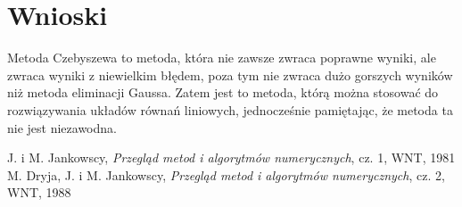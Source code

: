 \documentclass[a4paper]{article}
\begin{document}
\section{Wnioski}
Metoda Czebyszewa to metoda, która nie zawsze zwraca poprawne wyniki, ale zwraca wyniki z niewielkim błędem, poza tym nie zwraca dużo gorszych wyników niż metoda eliminacji Gaussa. Zatem jest to metoda, którą można stosować do rozwiązywania układów równań liniowych, jednocześnie pamiętając, że metoda ta nie jest niezawodna.
\begin{thebibliography}{9}
 J. i M. Jankowscy, {\it Przegląd metod i algorytmów numerycznych}, cz. 1, WNT, 1981
 M. Dryja, J. i M. Jankowscy, {\it Przegląd metod i algorytmów numerycznych}, cz. 2, WNT, 1988
\end{thebibliography}
\end{document}
